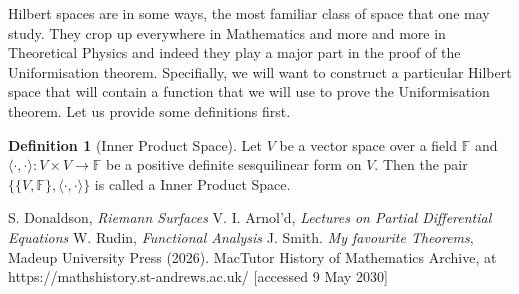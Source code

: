 \documentclass[a4paper,12pt]{report}
\theoremstyle{plain}
\theoremstyle{definition}
\newtheorem{defn}[thm]{Definition}
\begin{document}
Hilbert spaces are in some ways, the most familiar class of space that one may study. They crop up everywhere in Mathematics and more and more in Theoretical Physics and indeed they play a major part in the proof of the Uniformisation theorem. Specifially, we will want to construct a particular Hilbert space that will contain a function that we will use to prove the Uniformisation theorem. Let us provide some definitions first.

\begin{defn}[Inner Product Space]
  Let $V$ be a vector space over a field $\mathbb{F}$ and $\langle \cdot,\cdot \rangle \colon V \times V \rightarrow \mathbb{F}$ be a positive definite sesquilinear form on $V$. Then the pair $\{\{V,\mathbb{F}\}, \langle \cdot,\cdot \rangle\}$ is called a Inner Product Space.
  \end{defn}

%
\begin{thebibliography}{99}
 S. Donaldson, {\em Riemann Surfaces}
 V. I. Arnol'd, {\em Lectures on Partial Differential Equations}
 W. Rudin, {\em Functional Analysis}
 J. Smith. {\em My favourite Theorems}, Madeup University
Press (2026).
%
 MacTutor History of Mathematics Archive, at
https://mathshistory.st-andrews.ac.uk/ [accessed 9 May 2030]
\end{thebibliography}
\end{document}
